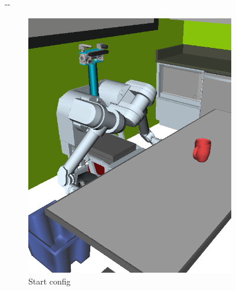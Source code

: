 \documentclass{report}
\newlength{\offsetpage}
\newenvironment{widepage}
   {\begin{adjustwidth}{-\offsetpage}{-\offsetpage}%
    \addtolength{\textwidth}{2\offsetpage}}%
{\end{adjustwidth}}
\begin{document}
{\begin{figure}
\begin{widepage}
\begin{center}
\begin{subfigure}[t]{0.19\linewidth}
\centering
\includegraphics[width=\columnwidth]{figs/testherb-a.png}
\caption{Start config}
\end{subfigure}
\begin{subfigure}[t]{0.19\linewidth}
\centering

\end{subfigure}
\end{center}
\end{widepage}
\end{figure}}
\end{document}
